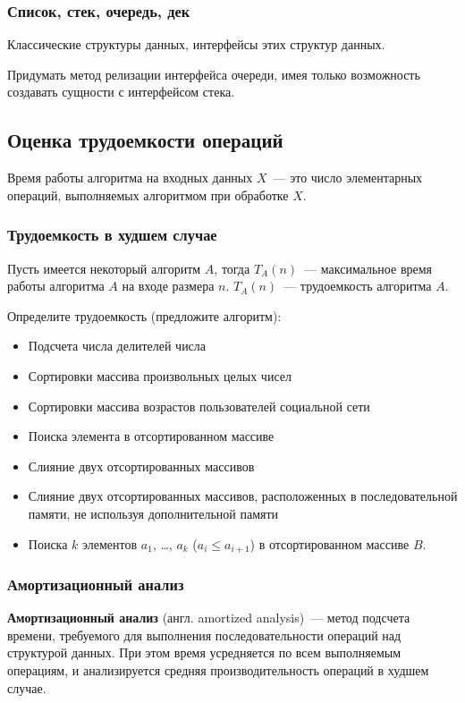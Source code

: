 \subsubsection*{Список, стек, очередь, дек}

Классические структуры данных, интерфейсы этих структур данных.

Придумать метод релизации интерфейса очереди, имея только возможность создавать сущности с интерфейсом стека.

\subsection{Оценка трудоемкости операций}
Время работы алгоритма на входных данных $X$~--- это число элементарных операций, выполняемых алгоритмом при обработке $X$.

\subsubsection*{Трудоемкость в худшем случае}

Пусть имеется некоторый алгоритм $A$, тогда $T_A(n)$~--- максимальное время работы алгоритма $A$ на входе размера $n$.
$T_A(n)$~--- трудоемкость алгоритма $A$.

Определите трудоемкость (предложите алгоритм):
\begin{itemize}
    \item Подсчета числа делителей числа
    \item Сортировки массива произвольных целых чисел
    \item Сортировки массива возрастов пользователей социальной сети
    \item Поиска элемента в отсортированном массиве
    \item Слияние двух отсортированных массивов
    \item Слияние двух отсортированных массивов, расположенных в последовательной памяти, не используя дополнительной памяти
    \item Поиска $k$ элементов $a_1$, \ldots, $a_k$ ($a_i \le a_{i+1}$) в отсортированном массиве $B$.
\end{itemize}

\subsubsection*{Амортизационный анализ}
\textbf{Амортизационный анализ} (англ. amortized analysis)~--- метод подсчета времени,
требуемого для выполнения последовательности операций над структурой данных.
При этом время усредняется по всем выполняемым операциям, и анализируется средняя производительность операций в худшем случае.

